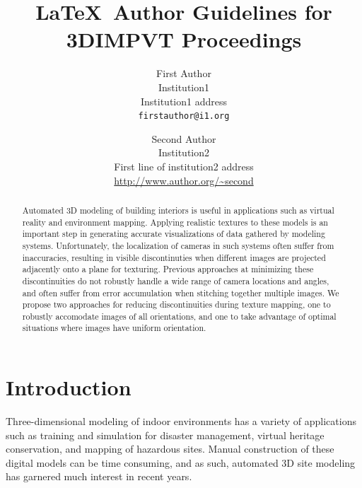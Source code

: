 \documentclass[10pt,twocolumn,letterpaper]{article}
\begin{document}
\title{\LaTeX\ Author Guidelines for 3DIMPVT Proceedings}

\author{First Author\\
  Institution1\\
  Institution1 address\\
  {\tt\small firstauthor@i1.org}
  \and
  Second Author\\
  Institution2\\
  First line of institution2 address\\
  {\small\url{http://www.author.org/~second}} }

\maketitle

\begin{abstract}
  Automated 3D modeling of building interiors is useful in
  applications such as virtual reality and environment
  mapping. Applying realistic textures to these models is an important
  step in generating accurate visualizations of data gathered by
  modeling systems.  Unfortunately, the localization of cameras in
  such systems often suffer from inaccuracies, resulting in visible
  discontinuties when different images are projected adjacently onto a
  plane for texturing. Previous approaches at minimizing these
  discontinuities do not robustly handle a wide range of camera
  locations and angles, and often suffer from error accumulation when
  stitching together multiple images. We propose two approaches for
  reducing discontinuities during texture mapping, one to robustly
  accomodate images of all orientations, and one to take advantage of
  optimal situations where images have uniform orientation.
\end{abstract}

\section{Introduction}
Three-dimensional modeling of indoor environments has a variety of
applications such as training and simulation for disaster management,
virtual heritage conservation, and mapping of hazardous sites. Manual
construction of these digital models can be time consuming, and as
such, automated 3D site modeling has garnered much interest in recent
years.
\end{document}

